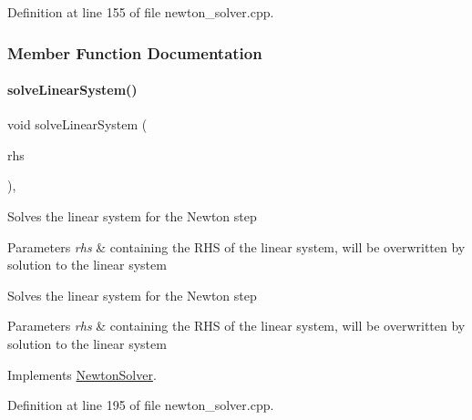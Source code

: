 Definition at line 155 of file newton\+\_\+solver.\+cpp.



\subsubsection{Member Function Documentation}
\mbox{\label{classamici_1_1_newton_solver_dense_aa4a6695d71f00ec1b46e94b33e55660f}} 
\paragraph{\texorpdfstring{solveLinearSystem()}{solveLinearSystem()}}
{\footnotesize\ttfamily void solve\+Linear\+System (\begin{DoxyParamCaption}\item[{\mbox{\hyperlink{classamici_1_1_ami_vector}{Ami\+Vector}} $\ast$}]{rhs }\end{DoxyParamCaption})\hspace{0.3cm}{\ttfamily [override]}, {\ttfamily [virtual]}}

Solves the linear system for the Newton step


\begin{DoxyParams}{Parameters}
{\em rhs} & containing the R\+HS of the linear system, will be overwritten by solution to the linear system \\
\hline
\end{DoxyParams}
Solves the linear system for the Newton step


\begin{DoxyParams}{Parameters}
{\em rhs} & containing the R\+HS of the linear system, will be overwritten by solution to the linear system\\
\hline
\end{DoxyParams}


Implements \mbox{\hyperlink{classamici_1_1_newton_solver_a761a5dc9e8cc7adfd4a392421df17c3d}{Newton\+Solver}}.



Definition at line 195 of file newton\+\_\+solver.\+cpp.

